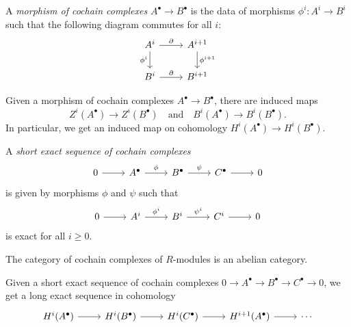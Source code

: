 \begin{definition}
  A \emph{morphism of cochain complexes}
  $A^\bullet \to B^\bullet$ is the data of
  morphisms $\phi^i : A^i \to B^i$ such that
  the following diagram commutes for
  all $i$:
  \[
    \begin{tikzcd}
      A^i \ar[r, "\partial"] \ar[d, swap, "\phi^i"] & A^{i + 1} \ar[d, "\phi^{i + 1}"] \\
      B^i \ar[r, "\partial"] & B^{i + 1}
    \end{tikzcd}
  \]
\end{definition}

\begin{remark}
  Given a morphism of cochain
  complexes $A^\bullet \to B^\bullet$,
  there are induced maps
  \[
    Z^i(A^\bullet) \to Z^i(B^\bullet)
    \quad \text{and} \quad
    B^i(A^\bullet) \to B^i(B^\bullet).
  \]
  In particular, we get an induced
  map on cohomology
  $H^i(A^\bullet) \to H^i(B^\bullet)$.
\end{remark}

\begin{definition}
  A \emph{short exact sequence of cochain complexes}
  \[
    \begin{tikzcd}
      0 \ar[r] & A^\bullet \ar[r, "\phi"] & B^\bullet \ar[r, "\psi"] & C^\bullet \ar[r] & 0
    \end{tikzcd}
  \]
  is given by morphisms $\phi$ and $\psi$
  such that
  \[
    \begin{tikzcd}
      0 \ar[r] & A^i \ar[r, "\phi^i"] & B^i \ar[r, "\psi^i"] & C^i \ar[r] & 0
    \end{tikzcd}
  \]
  is exact for all $i \ge 0$.
\end{definition}

\begin{remark}
  The category of cochain complexes
  of $R$-modules is an abelian category.
\end{remark}

\begin{prop}\label{prop:long}
  Given a short exact sequence of
  cochain complexes
  $0 \to A^\bullet \to B^\bullet \to C^\bullet \to 0$, we get a long exact
  sequence
  in cohomology
  \[
    \begin{tikzcd}
      H^i(A^\bullet) \ar[r] & H^i(B^\bullet) \ar[r] & H^i(C^\bullet) \ar[r] & H^{i + 1}(A^\bullet) \ar[r] & \cdots
    \end{tikzcd}
  \]
\end{prop}

